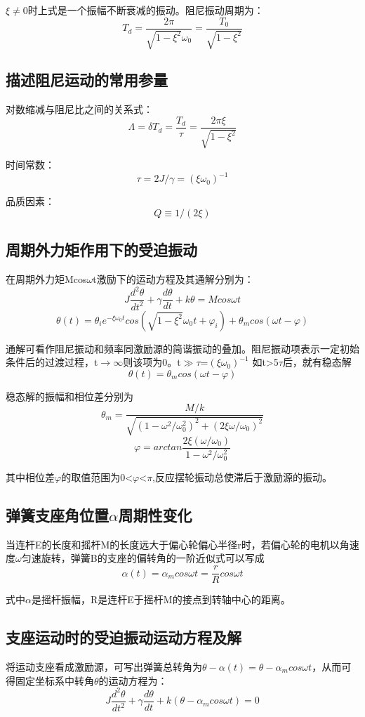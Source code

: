 \documentclass[UTF8]{ctexart}
\begin{document}
            $\xi$$\neq$0时上式是一个振幅不断衰减的振动。阻尼振动周期为：
            $$T_{d}=\frac{2\pi}{\sqrt{1-\xi^{2}}\omega_{0}}=\frac{T_{0}}{\sqrt{1-\xi^{2}}}$$
        \subsection{描述阻尼运动的常用参量}
            对数缩减与阻尼比之间的关系式：
            $$\Lambda=\delta T_{d}=\frac{T_{d}}{\tau}=\frac{2\pi\xi}{\sqrt{1-\xi^{2}}}$$

            时间常数：
            $$\tau=2J/\gamma=(\xi\omega_{0})^{-1}$$

            品质因素：
            $$Q\equiv1/(2\xi)$$
        \subsection{周期外力矩作用下的受迫振动}
            在周期外力矩Mcos$\omega$t激励下的运动方程及其通解分别为：
            $$J\frac{d^{2}\theta}{dt^{2}}+\gamma\frac{d\theta}{dt}+k\theta=Mcos\omega t$$
            $$\theta(t)=\theta_{i}e^{-\xi\omega_{0}t}cos(\sqrt{1-\xi^{2}}\omega_{0}t+\varphi_{i})+\theta_{m}cos(\omega t-\varphi)$$

            通解可看作阻尼振动和频率同激励源的简谐振动的叠加。阻尼振动项表示一定初始条件后的过渡过程，t$\to\infty$则该项为0。t$\gg\tau$=$(\xi\omega_{0})^{-1}$
            如t>5$\tau$后，就有稳态解
            $$\theta(t)=\theta_{m}cos(\omega t-\varphi)$$

            稳态解的振幅和相位差分别为
            $$\theta_{m}=\frac{M/k}{\sqrt{(1-\omega^{2}/\omega_{0}^{2})^{2}+(2\xi\omega/\omega_{0})^{2}}}$$
            $$\varphi=arctan\frac{2\xi(\omega/\omega_{0})}{1-\omega^{2}/\omega_{0}^{2}}$$

            其中相位差$\varphi$的取值范围为0<$\varphi$<$\pi$,反应摆轮振动总使滞后于激励源的振动。
        \subsection{弹簧支座角位置$\alpha$周期性变化}
            当连杆E的长度和摇杆M的长度远大于偏心轮偏心半径r时，若偏心轮的电机以角速度$\omega$匀速旋转，弹簧B的支座的偏转角的一阶近似式可以写成
            $$\alpha(t)=\alpha_{m}cos\omega t=\frac{r}{R}cos\omega t$$

            式中$\alpha$是摇杆振幅，R是连杆E于摇杆M的接点到转轴中心的距离。
        \subsection{支座运动时的受迫振动运动方程及解}
            将运动支座看成激励源，可写出弹簧总转角为$\theta-\alpha(t)=\theta-\alpha_{m}cos\omega t$，从而可得固定坐标系中转角$\theta$的运动方程为：
            $$J\frac{d^{2}\theta}{dt^{2}}+\gamma\frac{d\theta}{dt}+k(\theta-\alpha_{m}cos\omega t)=0$$
\end{document}
